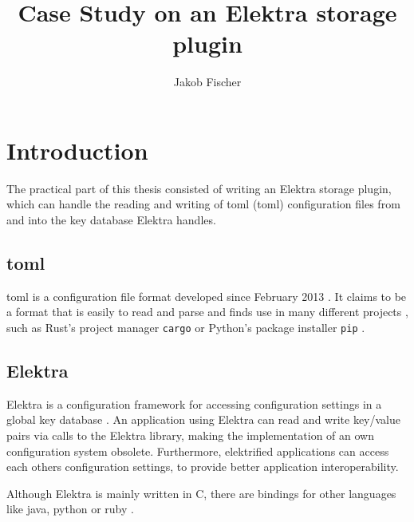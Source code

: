 \documentclass[draft,final]{vutinfth} %
\title{Case Study on an Elektra storage plugin }
\author{Jakob Fischer}
\begin{document}
\frontmatter

\addstatementpage

\begin{acknowledgements*}
\end{acknowledgements*}

\begin{kurzfassung}
\end{kurzfassung}


\begin{abstract}
\end{abstract}


\tableofcontents

\mainmatter

\chapter{Introduction}

The practical part of this thesis consisted of writing an Elektra storage plugin, which can handle the reading and writing of \acrshort{toml} (\acrlong{toml}) configuration files from and into the key database Elektra handles.

\section{\acrshort{toml}}
\acrlong{toml} is a configuration file format developed since February 2013 \cite{tomlcontrib}.
It claims to be a format that is easily to read and parse \cite{tomlreadme} and finds use in many different projects \cite{tomlwiki}, such as Rust's project manager \texttt{cargo} \cite{cargogit} or Python's package installer \texttt{pip} \cite{piprefguide}.

\section{Elektra}
Elektra is a configuration framework for accessing configuration settings in a global key database \cite{elektramain}.
An application using Elektra can read and write key/value pairs via calls to the Elektra library, making the implementation of an own configuration system obsolete.
Furthermore, elektrified applications can access each others configuration settings, to provide better application interoperability.

Although Elektra is mainly written in C, there are bindings for other languages like java, python or ruby \cite{elektrabindings}.
\end{document}

